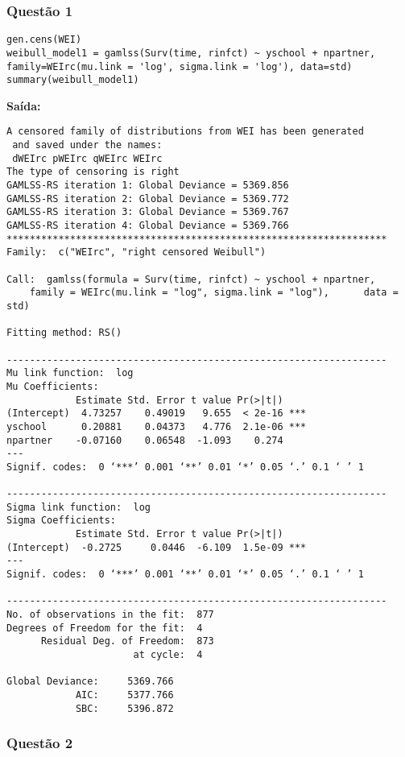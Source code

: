\documentclass[a4paper,12pt]{article}
\begin{document}
\subsubsection{Questão 1}

\begin{lstlisting}
gen.cens(WEI)
weibull_model1 = gamlss(Surv(time, rinfct) ~ yschool + npartner, family=WEIrc(mu.link = 'log', sigma.link = 'log'), data=std)
summary(weibull_model1)
\end{lstlisting}

\textbf{Saída:}
\begin{verbatim}
A censored family of distributions from WEI has been generated 
 and saved under the names:  
 dWEIrc pWEIrc qWEIrc WEIrc 
The type of censoring is right  
GAMLSS-RS iteration 1: Global Deviance = 5369.856 
GAMLSS-RS iteration 2: Global Deviance = 5369.772 
GAMLSS-RS iteration 3: Global Deviance = 5369.767 
GAMLSS-RS iteration 4: Global Deviance = 5369.766 
******************************************************************
Family:  c("WEIrc", "right censored Weibull") 

Call:  gamlss(formula = Surv(time, rinfct) ~ yschool + npartner,  
    family = WEIrc(mu.link = "log", sigma.link = "log"),      data = std) 

Fitting method: RS() 

------------------------------------------------------------------
Mu link function:  log
Mu Coefficients:
            Estimate Std. Error t value Pr(>|t|)    
(Intercept)  4.73257    0.49019   9.655  < 2e-16 ***
yschool      0.20881    0.04373   4.776  2.1e-06 ***
npartner    -0.07160    0.06548  -1.093    0.274    
---
Signif. codes:  0 ‘***’ 0.001 ‘**’ 0.01 ‘*’ 0.05 ‘.’ 0.1 ‘ ’ 1

------------------------------------------------------------------
Sigma link function:  log
Sigma Coefficients:
            Estimate Std. Error t value Pr(>|t|)    
(Intercept)  -0.2725     0.0446  -6.109  1.5e-09 ***
---
Signif. codes:  0 ‘***’ 0.001 ‘**’ 0.01 ‘*’ 0.05 ‘.’ 0.1 ‘ ’ 1

------------------------------------------------------------------
No. of observations in the fit:  877 
Degrees of Freedom for the fit:  4
      Residual Deg. of Freedom:  873 
                      at cycle:  4 
 
Global Deviance:     5369.766 
            AIC:     5377.766 
            SBC:     5396.872 
\end{verbatim}

\subsubsection{Questão 2}
\end{document}
